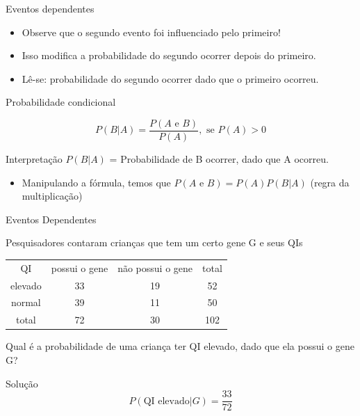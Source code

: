 \documentclass{beamer}
\begin{document}
\begin{frame}{Eventos dependentes}
  \begin{itemize}
  \item Observe que o segundo evento foi influenciado pelo primeiro!
  \item Isso modifica a probabilidade do segundo ocorrer
    \alert{depois} do primeiro.
  \item Lê-se: probabilidade do segundo ocorrer \alert{dado} que o
    primeiro ocorreu.
  \end{itemize}
\end{frame}

\begin{frame}{Probabilidade condicional}
  \begin{definition}
    \begin{displaymath}
      P(B|A) = \frac{P(A \text{ e } B)}{P(A)}, \text{ se } P(A)>0
    \end{displaymath}
  \end{definition}
  \begin{block}{Interpretação}
    $P(B|A)$ = Probabilidade de B ocorrer, \alert{dado que} A ocorreu.
  \end{block}
  \begin{itemize}
  \item Manipulando a fórmula, temos que $P(A \text{ e } B) =
    P(A)P(B|A)$ (regra da multiplicação)
  \end{itemize}
\end{frame}

\begin{frame}{Eventos Dependentes}
  \begin{example}
    Pesquisadores contaram crianças que tem um certo gene G e seus QIs

    \begin{tabular}{ccc|c}
      QI & possui o gene & não possui o gene & total\\
      elevado & 33 & 19 & 52\\
      normal & 39 & 11 & 50\\
      \hline
      total & 72 & 30 & 102\\
    \end{tabular}

    Qual é a probabilidade de uma criança ter QI elevado, dado que ela
    possui o gene G?
  \end{example}
  \begin{block}{Solução}
    \begin{displaymath}
      P(\text{QI elevado}| G) = \frac{33}{72}
    \end{displaymath}
  \end{block}
\end{frame}
\end{document}
